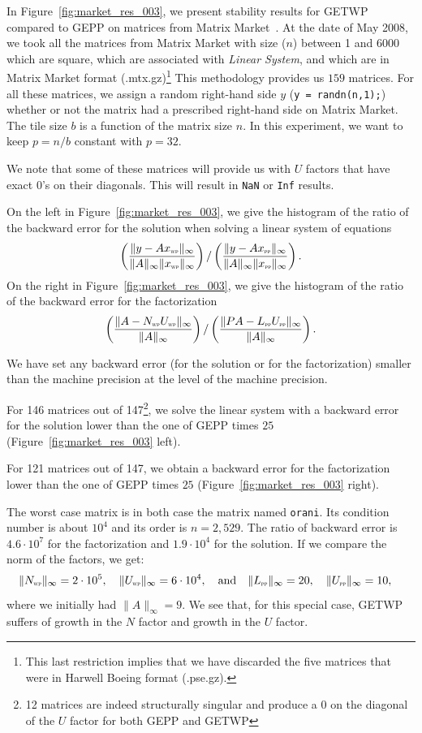 \documentclass{article}
\begin{document}
In Figure~\ref{fig:market_res_003}, we present stability results for GETWP
compared to GEPP on matrices from Matrix Market~\cite{matrixmarket}. At the
date of May 2008, we took all the matrices from Matrix Market with size ($n$)
between 1 and 6000 which are square, which are associated with \textit{Linear
System}, and which are in Matrix Market format (.mtx.gz)\footnote{This last restriction
implies  that we have discarded the five matrices that were in Harwell Boeing format (.pse.gz).} This
methodology provides us $159$ matrices.  For all these matrices, we assign a random
right-hand side $y$ (\texttt{y = randn(n,1);}) whether or not the matrix had a
prescribed right-hand side on Matrix Market. The tile size $b$ is a function of the 
matrix size $n$. In this experiment, we want to keep $p= n/b$ constant with $p=32$.

We note that some of these matrices will provide us with $U$ factors that have exact $0$'s
on their diagonals. This will result in \texttt{NaN} or \texttt{Inf} results.

On the left in Figure~\ref{fig:market_res_003}, we give the histogram of the 
ratio of the backward error for the solution when solving a linear system of equations
$$
\left(\frac{ \| y - A x_{\textsc{\tiny wp}} \|_\infty}{\| A \|_\infty \|x_{\textsc{\tiny wp}}\|_\infty }\right)
/
\left(\frac{ \| y - A x_{\textsc{\tiny pp}} \|_\infty}{\| A \|_\infty \|x_{\textsc{\tiny pp}}\|_\infty }\right).
$$
On the right in Figure~\ref{fig:market_res_003}, we give the histogram of the
ratio of the backward error for the factorization
$$
\left(\frac{ \| A - N_{\textsc{\tiny wp}}U_{\textsc{\tiny wp}} \|_\infty}{\| A \|_\infty }\right)
/
\left(\frac{ \| PA - L_{\textsc{\tiny pp}}U_{\textsc{\tiny pp}} \|_\infty}{\| A \|_\infty }\right).
$$

We have set any backward error (for the solution
or for the factorization) smaller than the machine precision 
at the level of the machine precision.

For 146 matrices out of 147\footnote{12 matrices
are indeed structurally singular and produce a 0 on the diagonal of the $U$ factor for both GEPP and GETWP},
we solve the linear system with a backward error for the solution lower than the one of
GEPP times $25$ (Figure~\ref{fig:market_res_003} left).

For 121 matrices out of 147,
we obtain a backward error for the factorization lower than the one of
GEPP times $25$ (Figure~\ref{fig:market_res_003} right).


The worst case matrix is in both case the matrix named \texttt{orani}.
Its condition number is about $10^4$ and its order is $n=2,529$. The ratio 
of backward error is 
$4.6\cdot10^7$ for the factorization and
$1.9\cdot10^4$ for the solution.
If we compare the norm of the factors, we get:
$$
\| N_{\textsc{\tiny wp}} \|_\infty = 2\cdot 10^5, \quad
\| U_{\textsc{\tiny wp}} \|_\infty = 6\cdot 10^4, \quad\textmd{and}\quad
\| L_{\textsc{\tiny pp}} \|_\infty = 20, \quad
\| U_{\textsc{\tiny pp}} \|_\infty = 10, \quad
$$
where we initially had $\| A \|_\infty = 9$.
We see that, for this special case, GETWP suffers of 
growth in the $N$ factor and growth in the  $U$ factor.
\end{document}
